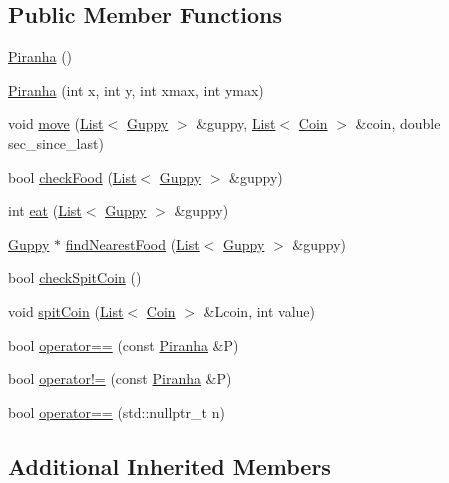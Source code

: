 \subsection*{Public Member Functions}
\begin{DoxyCompactItemize}
\item 
\mbox{\hyperlink{class_piranha_a7e3a4c5c7f458c16717c8cb997fc0331}{Piranha}} ()
\item 
\mbox{\hyperlink{class_piranha_a6ec745c27969134e5a2e4b07ed53d005}{Piranha}} (int x, int y, int xmax, int ymax)
\item 
void \mbox{\hyperlink{class_piranha_a541bc2d7d15271685dd138e0efd45d85}{move}} (\mbox{\hyperlink{class_list}{List}}$<$ \mbox{\hyperlink{class_guppy}{Guppy}} $>$ \&guppy, \mbox{\hyperlink{class_list}{List}}$<$ \mbox{\hyperlink{class_coin}{Coin}} $>$ \&coin, double sec\+\_\+since\+\_\+last)
\item 
bool \mbox{\hyperlink{class_piranha_ad7ead5c0a240432a18657b1415cadde0}{check\+Food}} (\mbox{\hyperlink{class_list}{List}}$<$ \mbox{\hyperlink{class_guppy}{Guppy}} $>$ \&guppy)
\item 
int \mbox{\hyperlink{class_piranha_ab7d97cc3807c53205937ad830f43e3bb}{eat}} (\mbox{\hyperlink{class_list}{List}}$<$ \mbox{\hyperlink{class_guppy}{Guppy}} $>$ \&guppy)
\item 
\mbox{\hyperlink{class_guppy}{Guppy}} $\ast$ \mbox{\hyperlink{class_piranha_a8f8e2a2d3e0ff7a0c712cf78ca578fa8}{find\+Nearest\+Food}} (\mbox{\hyperlink{class_list}{List}}$<$ \mbox{\hyperlink{class_guppy}{Guppy}} $>$ \&guppy)
\item 
bool \mbox{\hyperlink{class_piranha_a9db3ab2f9933739f5744e881f9ee386e}{check\+Spit\+Coin}} ()
\item 
void \mbox{\hyperlink{class_piranha_a4c1c29b2e68b4cb6eb2a295af74bf291}{spit\+Coin}} (\mbox{\hyperlink{class_list}{List}}$<$ \mbox{\hyperlink{class_coin}{Coin}} $>$ \&Lcoin, int value)
\item 
bool \mbox{\hyperlink{class_piranha_aa3789de8579639dcf38cde05b6869859}{operator==}} (const \mbox{\hyperlink{class_piranha}{Piranha}} \&P)
\item 
bool \mbox{\hyperlink{class_piranha_ab6eac12e7a9d9ce9243a16aebc8c9785}{operator!=}} (const \mbox{\hyperlink{class_piranha}{Piranha}} \&P)
\item 
bool \mbox{\hyperlink{class_piranha_a848b090631fa9bf1219ee1c925246125}{operator==}} (std\+::nullptr\+\_\+t n)
\end{DoxyCompactItemize}
\subsection*{Additional Inherited Members}


